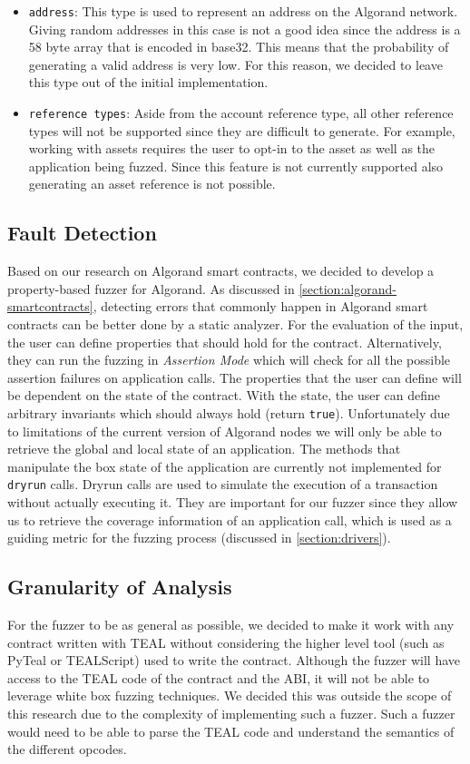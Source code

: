 \begin{itemize}
    \item \texttt{address}: This type is used to represent an address on the Algorand network.
          Giving random addresses in this case is not a good idea since the address is a 58 byte array that is encoded in base32.
          This means that the probability of generating a valid address is very low. For this reason, we decided to leave this type out of the initial implementation.
    \item \texttt{reference types}: Aside from the account reference type, all other reference types will not be supported since they are difficult to generate.
          For example, working with assets requires the user to opt-in to the asset as well as the application being fuzzed.
          Since this feature is not currently supported also generating an asset reference is not possible.
\end{itemize}

\subsection*{Fault Detection}
Based on our research on Algorand smart contracts, we decided to develop a property-based fuzzer for Algorand.
As discussed in \ref{section:algorand-smartcontracts}, detecting errors that commonly happen in Algorand smart contracts can be better done by a static analyzer.
For the evaluation of the input, the user can define properties that should hold for the contract.
Alternatively, they can run the fuzzing in \textit{Assertion Mode} which will check for all the possible assertion failures on application calls.
The properties that the user can define will be dependent on the state of the contract.
With the state, the user can define arbitrary invariants which should always hold (return \texttt{true}).
Unfortunately due to limitations of the current version of Algorand nodes we will only be able to retrieve the global and local state of an application.
The methods that manipulate the box state of the application are currently not implemented for \texttt{dryrun} calls.
Dryrun calls are used to simulate the execution of a transaction without actually executing it.
They are important for our fuzzer since they allow us to retrieve the coverage information of an application call, which is used as a guiding metric for the fuzzing process (discussed in \ref{section:drivers}).

\subsection*{Granularity of Analysis}
For the fuzzer to be as general as possible, we decided to make it work with any contract written with \ac{TEAL} without considering the higher level tool (such as PyTeal or TEALScript) used to write the contract.
Although the fuzzer will have access to the \ac{TEAL} code of the contract and the \ac{ABI}, it will not be able to leverage white box fuzzing techniques.
We decided this was outside the scope of this research due to the complexity of implementing such a fuzzer.
Such a fuzzer would need to be able to parse the \ac{TEAL} code and understand the semantics of the different opcodes.


